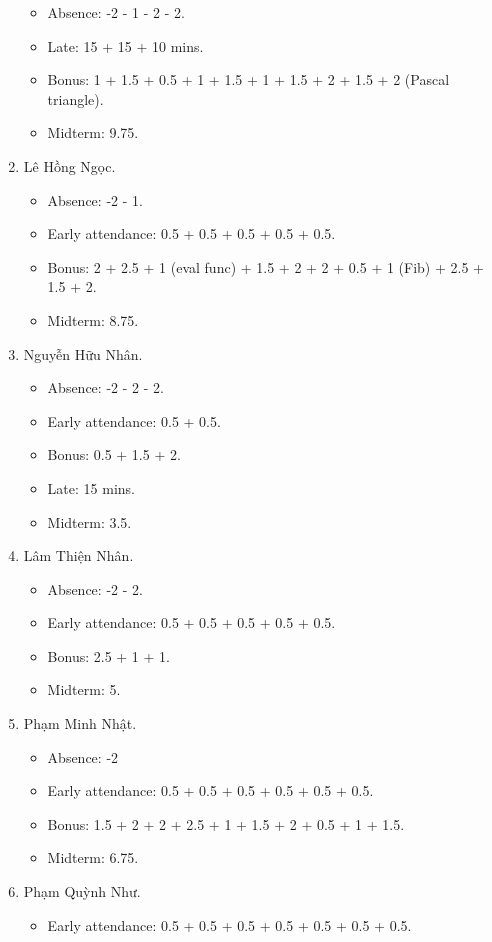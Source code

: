 \documentclass{article}
\begin{document}
\begin{enumerate}
\begin{itemize}
		\item Absence: -2 - 1 - 2 - 2.
		\item Late: 15 + 15 + 10 mins.
		\item Bonus: 1 + 1.5 + 0.5 + 1 + 1.5 + 1 + 1.5 + 2 + 1.5 + 2 (Pascal triangle).
        \item Midterm: 9.75.
	\end{itemize}
	\item {\sc Lê Hồng Ngọc.}
	\begin{itemize}
		\item Absence: -2 - 1.
		\item Early attendance: 0.5 + 0.5 + 0.5 + 0.5 + 0.5.
		\item Bonus: 2 + 2.5 + 1 (eval func) + 1.5 + 2 + 2 + 0.5 + 1 (Fib) + 2.5 + 1.5 + 2.
        \item Midterm: 8.75.
	\end{itemize}
	\item {\sc Nguyễn Hữu Nhân.}
	\begin{itemize}
		\item Absence: -2 - 2 - 2.
		\item Early attendance: 0.5 + 0.5.
		\item Bonus: 0.5 + 1.5 + 2.
		\item Late: 15 mins.
        \item Midterm: 3.5.
	\end{itemize}
	\item {\sc Lâm Thiện Nhân.}
	\begin{itemize}
		\item Absence: -2 - 2.
		\item Early attendance: 0.5 + 0.5 + 0.5 + 0.5 + 0.5.
		\item Bonus: 2.5 + 1 + 1.
        \item Midterm: 5.
	\end{itemize}
	\item {\sc Phạm Minh Nhật.}
	\begin{itemize}
		\item Absence: -2
		\item Early attendance: 0.5 + 0.5 + 0.5 + 0.5 + 0.5 + 0.5.
		\item Bonus: 1.5 + 2 + 2 + 2.5 + 1 + 1.5 + 2 + 0.5 + 1 + 1.5.
        \item Midterm: 6.75.
	\end{itemize}
	\item {\sc Phạm Quỳnh Như.}
	\begin{itemize}
		\item Early attendance: 0.5 + 0.5 + 0.5 + 0.5 + 0.5 + 0.5 + 0.5.

\end{itemize}
\end{enumerate}
\end{document}

